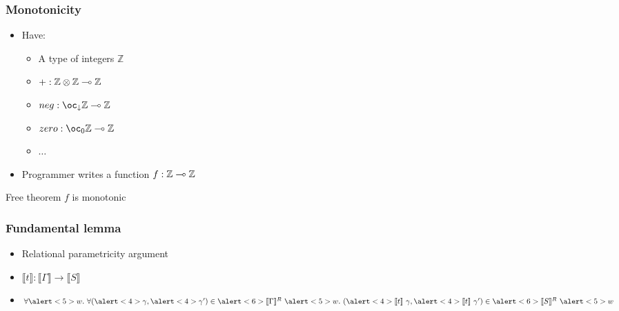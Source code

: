 \documentclass[fleqn]{beamer}
\begin{document}
  \begin{frame}
    \frametitle{Monotonicity}
    \newcommand{\Z}{\mathbb{Z}}
    \begin{itemize}
    \item Have: \pause
      \begin{itemize}
      \item A type of integers $\Z$ \pause
      \item $+ : \fun{\tensor{\Z}{\Z}}{\Z}$ \pause
      \item $\mathop{neg} : \fun{\excl{\downarrow}{\Z}}{\Z}$ \pause
      \item $\mathop{zero} : \fun{\excl{0}{\Z}}{\Z}$ \pause
      \item $\dots$
      \end{itemize}
    \item Programmer writes a function $f : \fun{\Z}{\Z}$ \pause
    \end{itemize}
    \begin{block}{Free theorem}
      $f$ is monotonic
    \end{block}
  \end{frame}
  \begin{frame}
    \frametitle{Fundamental lemma}
    \begin{itemize}
    \item<1-> Relational parametricity argument
    \item<2-> $\llbracket t \rrbracket : \llbracket \Gamma \rrbracket \to
      \llbracket S \rrbracket$
    \item<3-> $\forall \alert<5>{w}.~\forall(\alert<4>{\gamma}, \alert<4>{\gamma'}) \in \alert<6>{\llbracket \Gamma
      \rrbracket^R}~\alert<5>{w}.~(\alert<4>{\llbracket t \rrbracket~\gamma}, \alert<4>{\llbracket t
      \rrbracket~\gamma'}) \in \alert<6>{\llbracket S \rrbracket^R}~\alert<5>{w}$
    \end{itemize}
  \end{frame}
\end{document}
